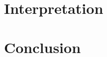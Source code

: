 \documentclass[11pt]{article}
\begin{document}


\section{Interpretation}






\section{Conclusion}





\printbibliography
\end{document}
